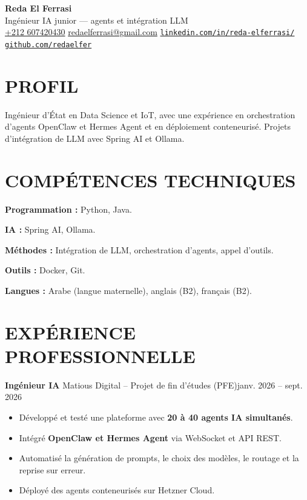 \documentclass[11pt,a4paper]{article}
\newcommand{\entry}[2]{\noindent #1\hfill #2\par}
\begin{document}
\begin{center}
  {\LARGE\bfseries Reda El Ferrasi}\\[3pt]
  {\large Ingénieur IA junior --- agents et intégration LLM}\\[5pt]
  {\small
    \href{tel:+212607420430}{+212 607420430}
    \enspace\textbar{}\enspace
    \href{mailto:redaelferrasi@gmail.com}{redaelferrasi@gmail.com}
    \enspace\textbar{}\enspace
    \href{https://www.linkedin.com/in/reda-elferrasi/}{\nolinkurl{linkedin.com/in/reda-elferrasi/}}
    \enspace\textbar{}\enspace
    \href{https://github.com/redaelfer}{\nolinkurl{github.com/redaelfer}}
  }
\end{center}
\vspace{-5pt}


\section*{PROFIL}
Ingénieur d’État en Data Science et IoT, avec une expérience en orchestration d’agents OpenClaw et Hermes Agent et en déploiement conteneurisé. Projets d’intégration de LLM avec Spring AI et Ollama.

\section*{COMPÉTENCES TECHNIQUES}
\textbf{Programmation :} Python, Java.\par
\textbf{IA :} Spring AI, Ollama.\par
\textbf{Méthodes :} Intégration de LLM, orchestration d'agents, appel d'outils.\par
\textbf{Outils :} Docker, Git.\par
\textbf{Langues :} Arabe (langue maternelle), anglais (B2), français (B2).

\section*{EXPÉRIENCE PROFESSIONNELLE}

\entry{\textbf{Ingénieur IA} \textbar{} Matious Digital -- Projet de fin d'études (PFE)}{janv. 2026 -- sept. 2026}
\begin{itemize}
  \item Développé et testé une plateforme avec \textbf{20 à 40 agents IA simultanés}.
  \item Intégré \textbf{OpenClaw et Hermes Agent} via WebSocket et API REST.
  \item Automatisé la génération de prompts, le choix des modèles, le routage et la reprise sur erreur.
  \item Déployé des agents conteneurisés sur Hetzner Cloud.
\end{itemize}
\end{document}
